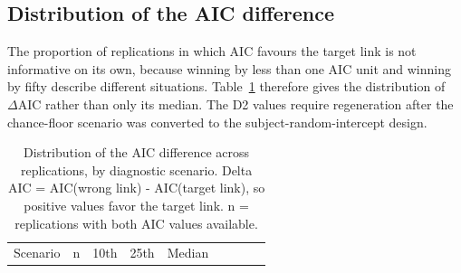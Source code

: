 \documentclass[
  man,
  floatsintext,
  longtable,
  nolmodern,
  notxfonts,
  notimes,
  colorlinks=true,linkcolor=blue,citecolor=blue,urlcolor=blue]{apa7}
\begin{document}
\subsection{Distribution of the AIC
difference}\label{distribution-of-the-aic-difference}

The proportion of replications in which AIC favours the target link is
not informative on its own, because winning by less than one AIC unit
and winning by fifty describe different situations.
Table~\ref{tbl-diagnostic-aic-distribution} therefore gives the
distribution of \(\Delta\mathrm{AIC}\) rather than only its median. The
D2 values require regeneration after the chance-floor scenario was
converted to the subject-random-intercept design.

\begin{longtable}[]{@{}
  >{\raggedright\arraybackslash}p{}
  >{\raggedleft\arraybackslash}p{}
  >{\raggedright\arraybackslash}p{}
  >{\raggedright\arraybackslash}p{}
  >{\raggedright\arraybackslash}p{}
  >{\raggedright\arraybackslash}p{}
  >{\raggedright\arraybackslash}p{}
  >{\raggedright\arraybackslash}p{}
  >{\raggedright\arraybackslash}p{}@{}}
\caption{Distribution of the AIC difference across replications, by
diagnostic scenario. Delta AIC = AIC(wrong link) - AIC(target link), so
positive values favor the target link. n = replications with both AIC
values available.}\label{tbl-diagnostic-aic-distribution}\tabularnewline
\toprule\noalign{}
\begin{minipage}[b]{\linewidth}\raggedright
Scenario
\end{minipage} & \begin{minipage}[b]{\linewidth}\raggedleft
n
\end{minipage} & \begin{minipage}[b]{\linewidth}\raggedright
10th
\end{minipage} & \begin{minipage}[b]{\linewidth}\raggedright
25th
\end{minipage} & \begin{minipage}[b]{\linewidth}\raggedright
Median
\end{minipage} & \begin{minipage}[b]{\linewidth}\raggedright

\end{minipage}
\end{longtable}
\end{document}
